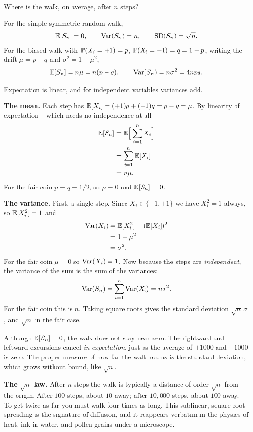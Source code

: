 Where is the walk, on average, after $n$ steps?

\begin{theorem}
\label{ch26:thm-meanvar}
For the simple symmetric random walk,
\[
  \E[S_n] = 0, \qquad \Var(S_n) = n, \qquad \SD(S_n) = \sqrt{n}.
\]
For the biased walk with $\P(X_i = +1) = p$, $\P(X_i = -1) = q = 1-p$, writing
the drift $\mu = p - q$ and $\sigma^2 = 1 - \mu^2$,
\[
  \E[S_n] = n\mu = n(p-q), \qquad \Var(S_n) = n\sigma^2 = 4npq.
\]
\end{theorem}

\begin{whybox}
Expectation is linear, and for independent variables variances add.

\textbf{The mean.} Each step has $\E[X_i] = (+1)p + (-1)q = p - q = \mu$. By
linearity of expectation -- which needs no independence at all --
\begin{align*}
  \E[S_n] &= \E\!\Big[\sum_{i=1}^n X_i\Big] \\
  &= \sum_{i=1}^n \E[X_i] \\
  &= n\mu.
\end{align*}
For the fair coin $p = q = 1/2$, so $\mu = 0$ and $\E[S_n] = 0$.

\textbf{The variance.} First, a single step. Since $X_i \in \{-1,+1\}$ we
have $X_i^2 = 1$ always, so $\E[X_i^2] = 1$ and
\begin{align*}
  \Var(X_i) &= \E[X_i^2] - (\E[X_i])^2 \\
  &= 1 - \mu^2 \\
  &= \sigma^2.
\end{align*}
For the fair coin $\mu = 0$ so $\Var(X_i) = 1$. Now because the steps are
\emph{independent}, the variance of the sum is the sum of the variances:
\[
  \Var(S_n) = \sum_{i=1}^n \Var(X_i) = n\sigma^2.
\]
For the fair coin this is $n$. Taking square roots gives the standard
deviation $\sqrt{n}\,\sigma$, and $\sqrt{n}$ in the fair case.
\end{whybox}

Although $\E[S_n] = 0$, the walk does not stay near zero. The rightward and leftward excursions cancel \emph{in expectation}, just as the average of $+1000$ and $-1000$ is zero. The proper measure of how far the walk roams is the standard deviation, which grows without bound, like $\sqrt{n}$.

\begin{focusbox}
\textbf{The $\sqrt{n}$ law.} After $n$ steps the walk is typically a distance
of order $\sqrt{n}$ from the origin. After $100$ steps, about $10$ away; after
$10{,}000$ steps, about $100$ away. To get twice as far you must walk four
times as long. This sublinear, square-root spreading is the signature of
diffusion, and it reappears verbatim in the physics of heat, ink in water, and
pollen grains under a microscope.
\end{focusbox}

